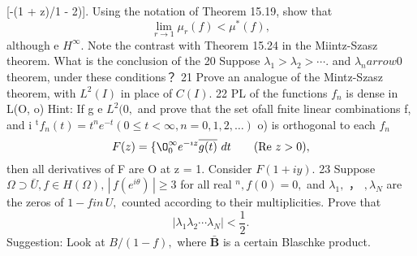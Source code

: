 [-(1 + z)/1 - 2)]. Using the notation of Theorem 15.19, show that $$ \operatorname*{lim}_{r\to1}\mu_{r}(f)<\mu^{*}(f), $$ although e $H^{\infty}.$ Note the contrast with Theorem 15.24 in the Miintz-Szasz theorem. What is the conclusion of the 20 Suppose $\lambda_{1}>\lambda_{2}>\cdots.$ and $\lambda_{n} arrow0$ theorem, under these conditions？ 21 Prove an analogue of the Mintz-Szasz theorem, with $L^{2}(I)$ in place of $C(I).$ 22 PL of the functions ${\mathbf{}}f_{n}$ is dense in L(O, o) Hint: If g e $L^{2}(0,$ and prove that the set ofall fnite linear combinations f, and i ${}^{\mathrm{t}}f_{n}(t)=t^{n}e^{-t}\left(0\leq t<\infty,n=0,1,2,\ldots\right)$ o) is orthogonal to each $f_{n}$ $$ F(z)= \{\O_{0}^{\infty}e^{-\imath z}\overline{{{g(t)}}}\ d t\qquad(\mathrm{Re}~z>0), $$ then all derivatives of F are O at z = 1. Consider $F(1+i y).$ 23 Suppose $\Omega\supset\bar{U},f\in H(\Omega),\,|\,f(e^{i\theta})\,|\geq3$ for all real ${}^{n},f(0)=0,$ and $\lambda_{1},$ ， $,{\lambda}_{N}$ are the zeros of ${1-f i n}\,U,$ counted according to their multiplicities. Prove that $$ \left|\lambda_{1}\lambda_{2}\cdots\lambda_{N}\right|<{\frac{1}{2}}. $$ Suggestion: Look at $B/(1-f),$ where $\bar{\boldsymbol{B}}$ is a certain Blaschke product.